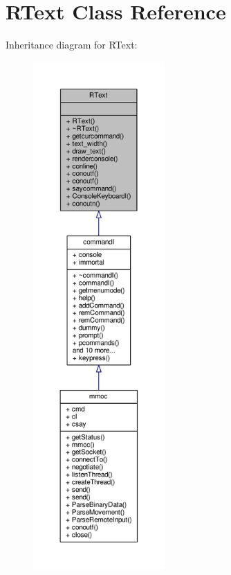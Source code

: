 \hypertarget{classRText}{}\section{R\+Text Class Reference}
\label{classRText}


Inheritance diagram for R\+Text\+:
\nopagebreak
\begin{figure}[H]
\begin{center}
\leavevmode
\includegraphics[height=550pt]{db/d60/classRText__inherit__graph}
\end{center}
\end{figure}


